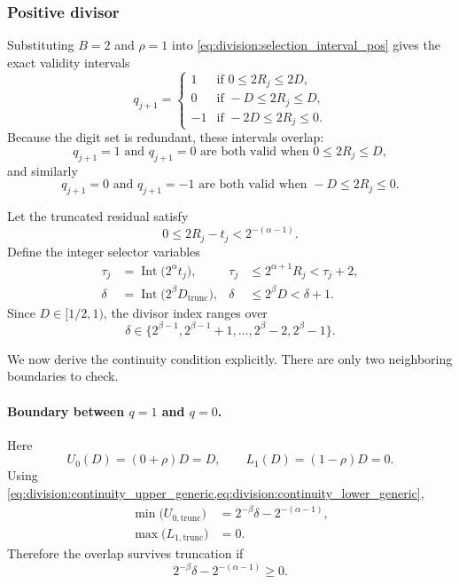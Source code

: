 \documentclass[11pt]{article}
\DeclareMathOperator{\Int}{Int}
\numberwithin{equation}{section}
\begin{document}
\subsubsection{Positive divisor}
\label{sssec:division:radix2_pos}

Substituting $B=2$ and $\rho=1$ into \cref{eq:division:selection_interval_pos} gives the exact
validity intervals
\begin{equation}
  \label{eq:division:radix2_intervals_pos}
  q_{j+1} =
  \begin{cases}
    1  & \text{if } 0 \le 2R_j \le 2D, \\
    0  & \text{if } -D \le 2R_j \le D, \\
    -1 & \text{if } -2D \le 2R_j \le 0.
  \end{cases}
\end{equation}
Because the digit set is redundant, these intervals overlap:
\[
  q_{j+1}=1 \text{ and } q_{j+1}=0 \text{ are both valid when } 0 \le 2R_j \le D,
\]
and similarly
\[
  q_{j+1}=0 \text{ and } q_{j+1}=-1 \text{ are both valid when } -D \le 2R_j \le 0.
\]

Let the truncated residual satisfy
\begin{equation}
  \label{eq:division:radix2_trunc_error}
  0 \le 2R_j - t_j < 2^{-(\alpha-1)}.
\end{equation}
Define the integer selector variables
\begin{align}
  \label{eq:division:radix2_tau_def}
  \tau_j &= \Int\bigl(2^{\alpha} t_j\bigr),
  &
  \tau_j &\le 2^{\alpha+1}R_j < \tau_j + 2, \\
  \label{eq:division:radix2_delta_def}
  \delta &= \Int\bigl(2^{\beta}D_{\text{trunc}}\bigr),
  &
  \delta &\le 2^{\beta}D < \delta+1.
\end{align}
Since $D \in [1/2,1)$, the divisor index ranges over
\begin{equation}
  \label{eq:division:radix2_delta_range}
  \delta \in \{2^{\beta-1},2^{\beta-1}+1,\dotsc,2^{\beta}-2,2^{\beta}-1\}.
\end{equation}

We now derive the continuity condition explicitly.
There are only two neighboring boundaries to check.

\paragraph{Boundary between $q=1$ and $q=0$.}
Here
\[
  U_0(D) = (0+\rho)D = D,
  \qquad
  L_1(D) = (1-\rho)D = 0.
\]
Using \cref{eq:division:continuity_upper_generic,eq:division:continuity_lower_generic},
\begin{align}
  \min\bigl(U_{0,\text{trunc}}\bigr)
  &= 2^{-\beta}\delta - 2^{-(\alpha-1)}, \nonumber \\
  \max\bigl(L_{1,\text{trunc}}\bigr)
  &= 0.
  \label{eq:division:radix2_cont_q1q0}
\end{align}
Therefore the overlap survives truncation if
\begin{equation}
  \label{eq:division:radix2_cont_q1q0_final}
  2^{-\beta}\delta - 2^{-(\alpha-1)} \ge 0.
\end{equation}
\end{document}
